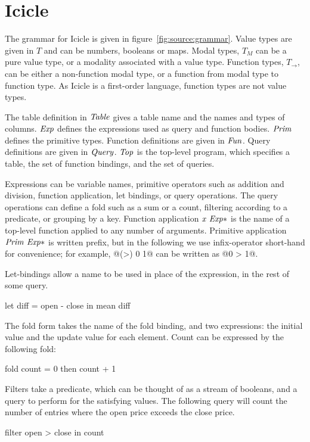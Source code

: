 \section{Icicle}
\label{s:IcicleSource}





The grammar for Icicle is given in figure~\ref{fig:source:grammar}.
Value types are given in $T$ and can be numbers, booleans or maps.
Modal types, $T_M$ can be a pure value type, or a modality associated with a value type.
Function types, $T_\to$, can be either a non-function modal type, or a function from modal type to function type.
As Icicle is a first-order language, function types are not value types.

The table definition in $\mathit{Table}$ gives a table name and the names and types of columns.
$\mathit{Exp}$ defines the expressions used as query and function bodies.
$\mathit{Prim}$ defines the primitive types.
Function definitions are given in $\mathit{Fun}$.
Query definitions are given in $\mathit{Query}$.
$\mathit{Top}$ is the top-level program, which specifies a table, the set of function bindings, and the set of queries.

Expressions can be variable names, primitive operators such as addition and division, function application, let bindings, or query operations.
The query operations can define a fold such as a sum or a count, filtering according to a predicate, or grouping by a key.
Function application $\mathit{x~Exp*}$ is the name of a top-level function applied to any number of arguments.
Primitive application $\mathit{Prim~Exp*}$ is written prefix, but in the following we use infix-operator short-hand for convenience; for example, @(>) 0 1@ can be written as @0 > 1@.

Let-bindings allow a name to be used in place of the expression, in the rest of some query.
\begin{code}
let diff = open - close
in  mean diff
\end{code}

The fold form takes the name of the fold binding, and two expressions: the initial value and the update value for each element.
Count can be expressed by the following fold:
\begin{code}
fold count = 0 then count + 1
\end{code}

Filters take a predicate, which can be thought of as a stream of booleans, and a query to perform for the satisfying values.
The following query will count the number of entries where the open price exceeds the close price.
\begin{code}
filter open > close in count
\end{code}

